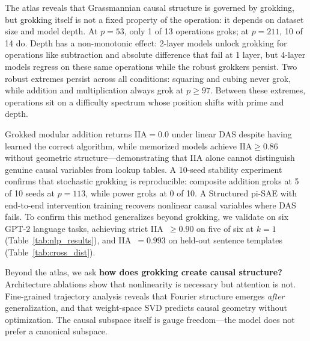\documentclass{article}
\newcommand{\IIA}{\mathrm{IIA}}
\begin{document}
The atlas reveals that Grassmannian causal structure is governed by grokking,
but grokking itself is not a fixed property of the operation: it depends on
dataset size and model depth. At $p{=}53$, only 1 of 13 operations groks; at
$p{=}211$, 10 of 14 do. Depth has a non-monotonic effect: 2-layer models
unlock grokking for operations like subtraction and absolute difference that
fail at 1 layer, but 4-layer models regress on these same operations while
the robust grokkers persist. Two robust
extremes persist across all conditions: squaring and cubing never grok, while
addition and multiplication always grok at $p \geq 97$. Between these
extremes, operations sit on a difficulty spectrum whose position shifts with
prime and depth.

Grokked modular addition returns $\IIA = 0.0$ under linear DAS despite having
learned the correct algorithm, while memorized models achieve
$\IIA \geq 0.86$ without geometric structure---demonstrating that IIA alone
cannot distinguish genuine causal variables from lookup tables.
A 10-seed stability experiment confirms that stochastic grokking is
reproducible: composite addition groks at 5 of 10 seeds at $p{=}113$,
while power groks at 0 of 10. A Structured pi-SAE with end-to-end
intervention training recovers nonlinear causal variables where DAS fails.
To confirm this method generalizes beyond grokking, we validate on six
GPT-2 language tasks, achieving strict IIA~$\geq 0.90$ on five of six at
$k{=}1$ (Table~\ref{tab:nlp_results}), and IIA~$= 0.993$ on held-out
sentence templates (Table~\ref{tab:cross_dist}).

Beyond the atlas, we ask \textbf{how does grokking create causal structure?}
Architecture ablations show that nonlinearity is necessary but attention is
not. Fine-grained trajectory analysis reveals that Fourier structure emerges
\emph{after} generalization, and that weight-space SVD predicts causal
geometry without optimization. The causal subspace itself is gauge
freedom---the model does not prefer a canonical subspace.
\end{document}
